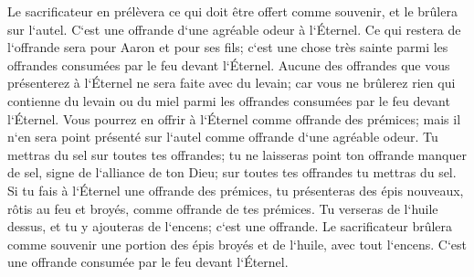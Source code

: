 \verse Le sacrificateur en prélèvera ce qui doit être offert comme souvenir, et le brûlera sur l`autel. C`est une offrande d`une agréable odeur à l`Éternel. 
\verse Ce qui restera de l`offrande sera pour Aaron et pour ses fils; c`est une chose très sainte parmi les offrandes consumées par le feu devant l`Éternel. 
\verse Aucune des offrandes que vous présenterez à l`Éternel ne sera faite avec du levain; car vous ne brûlerez rien qui contienne du levain ou du miel parmi les offrandes consumées par le feu devant l`Éternel. 
\verse Vous pourrez en offrir à l`Éternel comme offrande des prémices; mais il n`en sera point présenté sur l`autel comme offrande d`une agréable odeur. 
\verse Tu mettras du sel sur toutes tes offrandes; tu ne laisseras point ton offrande manquer de sel, signe de l`alliance de ton Dieu; sur toutes tes offrandes tu mettras du sel. 
\verse Si tu fais à l`Éternel une offrande des prémices, tu présenteras des épis nouveaux, rôtis au feu et broyés, comme offrande de tes prémices. 
\verse Tu verseras de l`huile dessus, et tu y ajouteras de l`encens; c`est une offrande. 
\verse Le sacrificateur brûlera comme souvenir une portion des épis broyés et de l`huile, avec tout l`encens. C`est une offrande consumée par le feu devant l`Éternel. 

